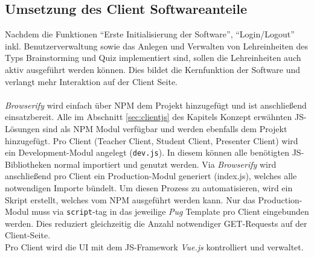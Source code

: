  \subsection{Umsetzung des Client Softwareanteile}\label{sec:implementclients}
Nachdem die Funktionen "`Erste Initialisierung der Software"', "`Login/Logout"' inkl. Benutzerverwaltung sowie das Anlegen und Verwalten von Lehreinheiten des Typs Brainstorming und Quiz implementiert sind, sollen die Lehreinheiten auch aktiv ausgeführt werden können. Dies bildet die Kernfunktion der Software und verlangt mehr Interaktion auf der Client Seite.\\ \\ 
\emph{Browserify} wird einfach über NPM dem Projekt hinzugefügt und ist anschließend einsatzbereit. Alle im Abschnitt \ref{sec:clientjs} des Kapitels Konzept erwähnten JS-Lösungen sind als NPM Modul verfügbar und werden ebenfalls dem Projekt hinzugefügt. Pro Client (Teacher Client, Student Client, Presenter Client) wird ein Development-Modul angelegt (\texttt{dev.js}). In diesem können alle benötigten JS-Bibliotheken normal importiert und genutzt werden. 
Via \emph{Browserify} wird anschließend pro Client ein Production-Modul generiert (index.js), welches alle notwendigen Importe bündelt. Um diesen Prozess zu automatisieren, wird ein Skript erstellt, welches vom NPM ausgeführt werden kann. Nur das Production-Modul muss via \texttt{script}-tag in das jeweilige \emph{Pug} Template pro Client eingebunden werden. Dies reduziert gleichzeitig die Anzahl notwendiger GET-Requests auf der Client-Seite. \\
Pro Client wird die UI mit dem JS-Framework \emph{Vue.js} kontrolliert und verwaltet. 
